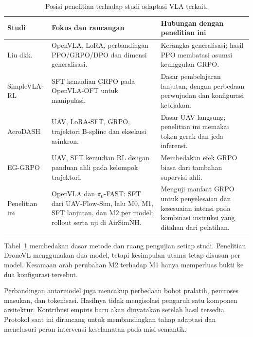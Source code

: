 \begin{table}[htbp]
\centering
\caption{Posisi penelitian terhadap studi adaptasi VLA terkait.}
\label{tab:posisi_penelitian}
\small
\begin{tabularx}{\linewidth}{|p{2.8cm}|X|X|}
\hline
\textbf{Studi} & \textbf{Fokus dan rancangan} & \textbf{Hubungan dengan penelitian ini} \\
\hline
Liu dkk. \citep{liu2025rlvla} & OpenVLA, LoRA, perbandingan PPO/GRPO/DPO dan dimensi generalisasi. & Kerangka generalisasi; hasil PPO membatasi asumsi keunggulan GRPO. \\
\hline
SimpleVLA-RL \citep{li2026simplevlarl} & SFT kemudian GRPO pada OpenVLA-OFT untuk manipulasi. & Dasar pembelajaran lanjutan, dengan perbedaan perwujudan dan konfigurasi kebijakan. \\
\hline
AeroDASH \citep{liu2026aerodash} & UAV, LoRA-SFT, GRPO, trajektori B-spline dan eksekusi asinkron. & Dasar UAV langsung; penelitian ini memakai token gerak dan jeda inferensi. \\
\hline
EG-GRPO \citep{chen2026eggrpo} & UAV, SFT kemudian RL dengan panduan ahli pada kelompok trajektori. & Membedakan efek GRPO biasa dari tambahan supervisi ahli. \\
\hline
Penelitian ini & OpenVLA dan $\pi_0$-FAST: SFT dari UAV-Flow-Sim, lalu M0, M1, SFT lanjutan, dan M2 per model; rollout serta uji di AirSimNH. & Menguji manfaat GRPO untuk penyelesaian dan kesesuaian intensi pada kombinasi instruksi yang ditahan dari pelatihan. \\
\hline
\end{tabularx}
\end{table}
Tabel~\ref{tab:posisi_penelitian} membedakan dasar metode dan ruang pengujian setiap studi. Penelitian DroneVL menggunakan dua model, tetapi kesimpulan utama tetap disusun per model. Kesamaan arah perubahan M2 terhadap M1 hanya memperluas bukti ke dua konfigurasi tersebut.

Perbandingan antarmodel juga mencakup perbedaan bobot pralatih, pemroses masukan, dan tokenisasi. Hasilnya tidak mengisolasi pengaruh satu komponen arsitektur. Kontribusi empiris baru akan dinyatakan setelah hasil tersedia. Protokol saat ini dirancang untuk membandingkan tahap adaptasi dan menelusuri peran intervensi keselamatan pada misi semantik.
